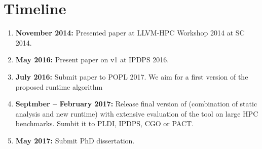 \section{Timeline}
\label{sec:timeline}

\begin{enumerate}
\item \textbf{November 2014:} Presented paper at LLVM-HPC Workshop 2014 at SC
  2014.
\item \textbf{May 2016:} Present paper on \archer v1 at IPDPS 2016.
\item \textbf{July 2016:} Submit paper to POPL 2017. We aim for a first
  version of the proposed runtime algorithm
\item \textbf{Septmber -- February 2017:} Release final version of \archer
  (combination of static analysis and new runtime) with extensive evaluation
  of the tool on large HPC benchmarks.
  Sumbit it to PLDI, IPDPS, CGO or PACT.
\item \textbf{May 2017:} Submit PhD dissertation.
\end{enumerate}

